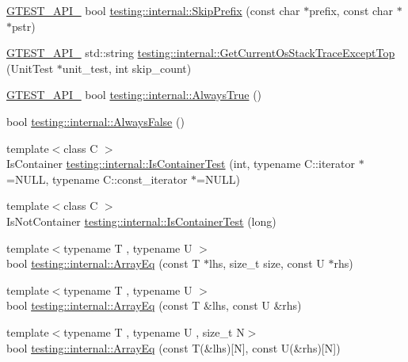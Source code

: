 \begin{DoxyCompactItemize}
\mbox{\hyperlink{gtest-port_8h_aa73be6f0ba4a7456180a94904ce17790}{G\+T\+E\+S\+T\+\_\+\+A\+P\+I\+\_\+}} bool \mbox{\hyperlink{namespacetesting_1_1internal_aac72b20299ad4a99554ce161e1769560}{testing\+::internal\+::\+Skip\+Prefix}} (const char $\ast$prefix, const char $\ast$$\ast$pstr)
\item 
\mbox{\hyperlink{gtest-port_8h_aa73be6f0ba4a7456180a94904ce17790}{G\+T\+E\+S\+T\+\_\+\+A\+P\+I\+\_\+}} std\+::string \mbox{\hyperlink{namespacetesting_1_1internal_ae7ae495d3207e26968dfbd537c5e6dee}{testing\+::internal\+::\+Get\+Current\+Os\+Stack\+Trace\+Except\+Top}} (Unit\+Test $\ast$unit\+\_\+test, int skip\+\_\+count)
\item 
\mbox{\hyperlink{gtest-port_8h_aa73be6f0ba4a7456180a94904ce17790}{G\+T\+E\+S\+T\+\_\+\+A\+P\+I\+\_\+}} bool \mbox{\hyperlink{namespacetesting_1_1internal_a4d46f09c3bfe68700b7f728d2cc3782f}{testing\+::internal\+::\+Always\+True}} ()
\item 
bool \mbox{\hyperlink{namespacetesting_1_1internal_a4b24c851ab13569b1b15b3d259b60d2e}{testing\+::internal\+::\+Always\+False}} ()
\item 
{\footnotesize template$<$class C $>$ }\\Is\+Container \mbox{\hyperlink{namespacetesting_1_1internal_acb6ea1086293c1d6636e3c67941351fb}{testing\+::internal\+::\+Is\+Container\+Test}} (int, typename C\+::iterator $\ast$=N\+U\+LL, typename C\+::const\+\_\+iterator $\ast$=N\+U\+LL)
\item 
{\footnotesize template$<$class C $>$ }\\Is\+Not\+Container \mbox{\hyperlink{namespacetesting_1_1internal_af545a2ae928b8a9e7581978234464275}{testing\+::internal\+::\+Is\+Container\+Test}} (long)
\item 
{\footnotesize template$<$typename T , typename U $>$ }\\bool \mbox{\hyperlink{namespacetesting_1_1internal_af4bebf36baf0b0a5b26d051dde55fa47}{testing\+::internal\+::\+Array\+Eq}} (const T $\ast$lhs, size\+\_\+t size, const U $\ast$rhs)
\item 
{\footnotesize template$<$typename T , typename U $>$ }\\bool \mbox{\hyperlink{namespacetesting_1_1internal_a49b4d0ee49c0f8c93bab29ebd20630cc}{testing\+::internal\+::\+Array\+Eq}} (const T \&lhs, const U \&rhs)
\item 
{\footnotesize template$<$typename T , typename U , size\+\_\+t N$>$ }\\bool \mbox{\hyperlink{namespacetesting_1_1internal_a5cb6f81ee827130024261121c742b26c}{testing\+::internal\+::\+Array\+Eq}} (const T(\&lhs)\mbox{[}N\mbox{]}, const U(\&rhs)\mbox{[}N\mbox{]})
$$
\end{DoxyCompactItemize}

